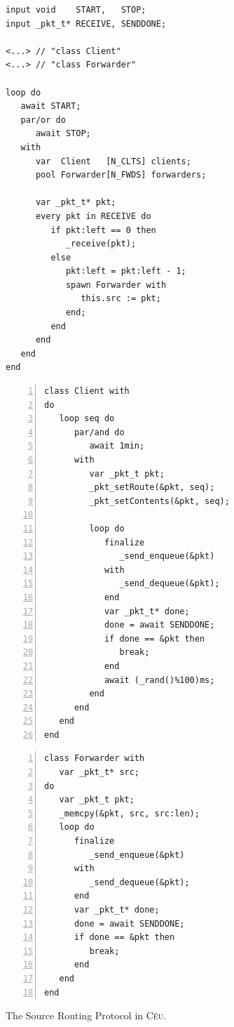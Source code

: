 \documentclass{sigplanconf}
\newcommand{\CEU}{\textsc{C\'{e}u}\xspace}
\newcommand{\1}{\;}
\newcommand{\2}{\;\;}
\newcommand{\3}{\;\;\;}
\newcommand{\5}{\;\;\;\;\;}
\begin{document}
\begin{figure}[t]
\begin{minipage}[t]{0.34\linewidth}
\begin{lstlisting}
input void    START,   STOP;
input _pkt_t* RECEIVE, SENDDONE;

<...> // "class Client"
<...> // "class Forwarder"

loop do
   await START;
   par/or do
      await STOP;
   with
      var  Client   [N_CLTS] clients;
      pool Forwarder[N_FWDS] forwarders;

      var _pkt_t* pkt;
      every pkt in RECEIVE do
         if pkt:left == 0 then
            _receive(pkt);
         else
            pkt:left = pkt:left - 1;
            spawn Forwarder with
               this.src := pkt;
            end;
         end
      end
   end
end
\end{lstlisting}
\end{minipage}
%
\begin{minipage}[t]{0.35\linewidth}
\begin{lstlisting}[numbers=left,xleftmargin=2.5em]
class Client with
do
   loop seq do
      par/and do
         await 1min;
      with
         var _pkt_t pkt;
         _pkt_setRoute(&pkt, seq);
         _pkt_setContents(&pkt, seq);

         loop do
            finalize
               _send_enqueue(&pkt)
            with
               _send_dequeue(&pkt);
            end
            var _pkt_t* done;
            done = await SENDDONE;
            if done == &pkt then
               break;
            end
            await (_rand()%100)ms;
         end
      end
   end
end

\end{lstlisting}
\end{minipage}
%
\begin{minipage}[t]{0.30\linewidth}
\begin{lstlisting}[numbers=left,xleftmargin=2.5em]
class Forwarder with
   var _pkt_t* src;
do
   var _pkt_t pkt;
   _memcpy(&pkt, src, src:len);
   loop do
      finalize
         _send_enqueue(&pkt)
      with
         _send_dequeue(&pkt);
      end
      var _pkt_t* done;
      done = await SENDDONE;
      if done == &pkt then
         break;
      end
   end
end
\end{lstlisting}
\end{minipage}
%
\caption{ The Source Routing Protocol in \CEU.
\label{lst.apps.srp}
}
\end{figure}
\end{document}

